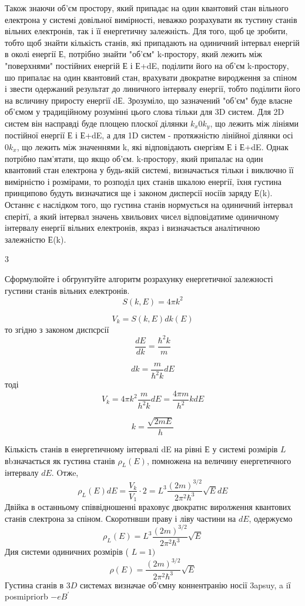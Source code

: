 \documentclass[a4paper,14pt]{extreport}
\begin{document}
Також знаючи об'єм простору, який припадає на один квантовий стан
вільного електрона у системі довільної вимірності, неважко розрахувати як
тустину станів вільних електронів, так і її енергетичну залежність. Для того, щоб це зробити, тобто щоб знайти кількість станів, які припадають на
одиничний інтервал енергій в околі енергії Е, потрібно знайти
"об'єм"\text{ } k-простору, який лежить між "поверхнями" \text{ } постійних енергій Е і Е+dE,
поділити його на об'єм k-простору, шо припалає на один квантовий стан,
врахувати двократне виродження за спіном і звести одержаний результат до
линичного інтервалу енергії, тобто поділити його на всличину приросту
енергії dЕ. Зрозуміло, що зазначений "об'єм" \text{ } буде власне об'ємом у
традиційному розумінні цього слова тільки для 3D систем. Для 2D систем він
насправді буде площею плоскої ділянки $k_x0k_y$, що лежить між лініями постійної енергії Е і Е+dE, а для 1D систем - протяжністю лінійної ділянки осі $0k_x$, що лежить між значеннями k, які відповідають єнергіям Е і Е+dE. Однак потрібно пам'ятати, що якщо об'єм. k-простору, який припалає на один квантовий стан електрона у будь-якій системі, визначається тільки і виключно її вимірністю і розмірами, то розподіл цих станів шкалою енергії, їхня густина принципово
будуть визначатися ще і законом дисперсії носіїв заряду Е(k). Останнє є
наслідком того, що густина станів нормується на одиничний інтервал єперітї, а який інтервал значень хвильових чисел відповідатиме одиничному інтервалу енергії вільних електронів, якраз і визначається аналітичною залежністю Е(k).

\begin{center}3\end{center} Сформулюйте і обгрунтуйте алгоритм розрахунку енергетичної залежності густини станів вільних електронів.
$$
S(k, E)=4 \pi k^{2}
$$

$$
V_{k}=S(k, E) d k(E)
$$
то згідно з законом диспсрсії
$$
\frac{d E}{d k}=\frac{\hbar^{2} k}{m}
$$

$$
d k=\frac{m}{\hbar^{2} k} d E
$$
тоді
$$
V_{k}=4 \pi k^{2} \frac{m}{h^{2} k} d E=\frac{4 \pi m}{h^{2}} k d E
$$

$$
k=\frac{\sqrt{2 m E}}{h}
$$

Кількість станів в енергетичному інтервалі dE на рівні Е у системі розмірів $L$ вbзначається як густина станів $\rho_{L}(E)$, помножена на величину енергетичного інтервалу $d E$. Oтжe,
$$
\rho_{L}(E) d E=\frac{V_{k}}{V_{1}} \cdot 2=L^{3} \frac{(2 m)^{3 / 2}}{2 \pi^{2} \hbar^{3}} \sqrt{E} d E
$$
Двійка в останньому співвідношенні враховує двократнс виролження квантових станів слектрона за спіном. Скоротнвши праву і ліву частини на $d E$, одержуємо
$$
\rho_{L}(E)=L^{3} \frac{(2 m)^{3 / 2}}{2 \pi^{2} \hbar^{3}} \sqrt{E}
$$
Дия системи одиничних розмірів ( $L=1)$
$$
\rho(E)=\frac{(2 m)^{3 / 2}}{2 \pi^{2} \hbar^{3}} \sqrt{E}
$$
Густина сганів в $3 D$ системах визначае об'ємну коннентранію носії 3apsuy, a iї posmipriorb $-e B^{\prime}$
\end{document}
